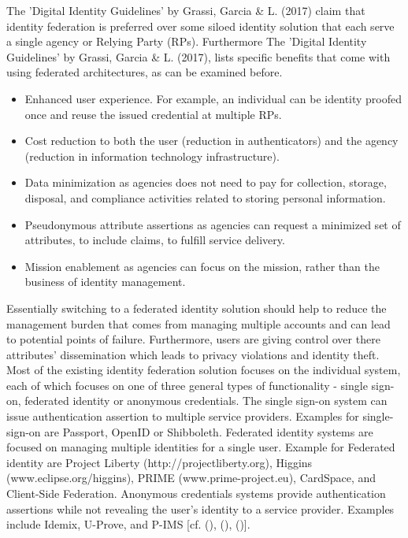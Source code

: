 {{	
	The 'Digital Identity Guidelines' by Grassi, Garcia \& L. (2017) claim that identity federation is preferred over some siloed identity solution that each serve a single agency or Relying Party (RPs). Furthermore The 'Digital Identity Guidelines' by Grassi, Garcia \& L. (2017), lists specific benefits that come with using federated architectures, as can be examined before. 
	
	\begin{itemize}
		\item Enhanced user experience. For example, an individual can be identity proofed once and reuse the issued credential at multiple RPs. 
		\item Cost reduction to both the user (reduction in authenticators) and the agency (reduction in information technology infrastructure). 
		\item Data minimization as agencies does not need to pay for collection, storage, disposal, and compliance activities related to storing personal information. 
		\item Pseudonymous attribute assertions as agencies can request a minimized set of attributes, to include claims, to fulfill service delivery. 
		\item Mission enablement as agencies can focus on the mission, rather than the business of identity management.
	\end{itemize}
	
	Essentially switching to a federated identity solution should help to reduce the management burden that comes from managing multiple accounts and can lead to potential points of failure.  Furthermore, users are giving control over there attributes' dissemination which leads to privacy violations and identity theft. Most of the existing identity federation solution focuses on the individual system, each of which focuses on one of three general types of functionality - single sign-on, federated identity or anonymous credentials. The single sign-on system can issue authentication assertion to multiple service providers. Examples for single-sign-on are Passport, OpenID or Shibboleth. Federated identity systems are focused on managing multiple identities for a single user. Example for Federated identity are Project Liberty (http://projectliberty.org), Higgins (www.eclipse.org/higgins), PRIME (www.prime-project.eu), CardSpace, and
	Client-Side Federation. Anonymous credentials systems provide authentication assertions while not revealing the user's identity to a service provider. Examples include Idemix, U-Prove, and P-IMS [cf. (\cite{Birell:2013:FIMS}), (\cite{Boyed:2012:GSOA}), (\cite{NIST:2017:DIG})].
		
}}
